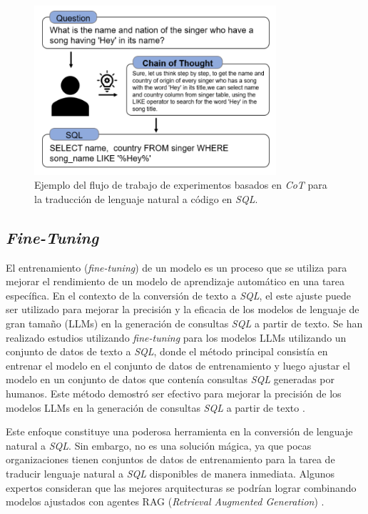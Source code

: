 \begin{figure}[H]\label{fslpromtpsql}
	\centering
	\includegraphics[width = 0.8\textwidth]{./Graphics/cotpromptsql}
	\caption{Ejemplo del flujo de trabajo de experimentos basados en \textit{CoT} para la traducción de lenguaje natural a código en \textit{SQL}.}
\end{figure}

\subsection{\textit{Fine-Tuning}} \label{llm_approach_finetunig}

El entrenamiento (\textit{fine-tuning}) de un modelo es un proceso que se utiliza para mejorar el rendimiento de un modelo de aprendizaje automático en una tarea específica. En el contexto de la conversión de texto a \textit{SQL}, el este ajuste puede ser utilizado para mejorar la precisión y la eficacia de los modelos de lenguaje de gran tamaño (LLMs) en la generación de consultas \textit{SQL} a partir de texto. Se han realizado estudios  utilizando \textit{fine-tuning} para los modelos LLMs utilizando un conjunto de datos de texto a \textit{SQL}, donde el método principal consistía en entrenar el modelo en el conjunto de datos de entrenamiento y luego ajustar el modelo en un conjunto de datos que contenía consultas \textit{SQL} generadas por humanos. Este método demostró ser efectivo para mejorar la precisión de los modelos LLMs en la generación de consultas \textit{SQL} a partir de texto \cite{finetuningtext2sql}.

Este enfoque constituye una poderosa herramienta  en la conversión de lenguaje natural a \textit{SQL}. Sin embargo, no es una solución mágica, ya que pocas organizaciones tienen conjuntos de datos de entrenamiento para la tarea de traducir lenguaje natural a \textit{SQL} disponibles de manera inmediata. Algunos expertos consideran que las mejores arquitecturas se podrían lograr combinando modelos ajustados con agentes RAG (\textit{Retrieval Augmented Generation}) \cite{raginfo}.

